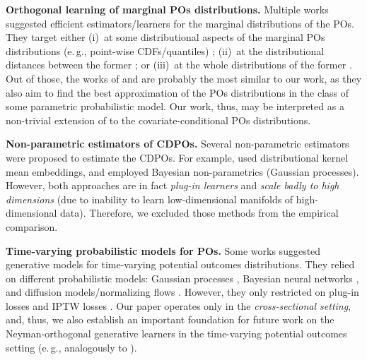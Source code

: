 \documentclass[dvipsnames]{article} %
\newcommand\eg{e.\,g.\xspace}
\newcommand{\CDPOs}{CDPOs\xspace}
\begin{document}
\textbf{Orthogonal learning of marginal POs distributions.} Multiple works suggested efficient estimators/learners for the marginal distributions of the POs. They target either (i)~at some distributional aspects of the marginal POs distributions (\eg, point-wise CDFs/quantiles) \citep{chernozhukov2013inference,firpo2007efficient,byambadalai2025on}; (ii)~at the distributional distances between the former \citep{kim2018causal,martinez2023efficient, fawkes2024doubly}; or (iii)~at the whole distributions of the former  \citep{kim2018causal,kennedy2023semiparametric,melnychuk2023normalizing,martinez2024counterfactual,luedtke2024one}. Out of those, the works of \citet{kennedy2023semiparametric} and \citet{melnychuk2023normalizing} are probably the most similar to our work, as they also aim to find the best approximation of the POs distributions in the class of some parametric probabilistic model. Our work, thus, may be interpreted as a non-trivial extension of  \citep{kennedy2023semiparametric,melnychuk2023normalizing} to the covariate-conditional POs distributions. 

\textbf{Non-parametric estimators of \CDPOs.} Several non-parametric estimators were proposed to estimate the \CDPOs. For example, \citet{muandet2021counterfactual} used distributional kernel mean embeddings, and \citet{alaa2017bayesian,alaa2018limits} employed Bayesian non-parametrics (Gaussian processes). However, both approaches are in fact \emph{plug-in learners} and \emph{scale badly to high dimensions} (due to inability to learn low-dimensional manifolds of high-dimensional data). Therefore, we excluded those methods from the empirical comparison. 

\textbf{Time-varying probabilistic models for POs.} Some works suggested generative models for time-varying potential outcomes distributions. They relied on different probabilistic models: Gaussian processes \citep{schulam2017reliable}, Bayesian neural networks \citep{hess2024bayesian}, and diffusion models/normalizing flows \citep{wu2024counterfactual,mu2025counterfactual}. However, they only restricted on plug-in losses \citep{schulam2017reliable,hess2024bayesian,mu2025counterfactual} and IPTW losses \citep{wu2024counterfactual}. Our paper operates only in the \emph{cross-sectional setting}, and, thus, we also establish an important foundation for future work on the Neyman-orthogonal generative learners in the time-varying potential outcomes setting (\eg, analogously to \citep{frauen2025modelagnostic}).
\end{document}
